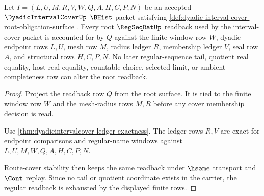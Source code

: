 \begin{theorem}
\label{thm:dyadic-interval-cover-root-regular-readback}
Let $I=(L,U,M,R,V,W,Q,A,H,C,P,N)$ be an accepted $\DyadicIntervalCoverUp$ $\BHist$ packet satisfying \autoref{def:dyadic-interval-cover-root-obligation-surface}. Every root $\RegSeqRatUp$ readback used by the interval-cover packet is accounted for by $Q$ against the finite window row $W$, dyadic endpoint rows $L,U$, mesh row $M$, radius ledger $R$, membership ledger $V$, seal row $A$, and structural rows $H,C,P,N$. No later regular-sequence tail, quotient real equality, host real equality, countable choice, selected limit, or ambient completeness row can alter the root readback.
\end{theorem}
\begin{proof}
Project the readback row $Q$ from the root surface. It is tied to the finite window row $W$ and the mesh-radius rows $M,R$ before any cover membership decision is read.

Use \autoref{thm:dyadicintervalcover-ledger-exactness}. The ledger rows $R,V$ are exact for endpoint comparisons and regular-name windows against $L,U,M,W,Q,A,H,C,P,N$.

Route-cover stability then keeps the same readback under $\hsame$ transport and $\Cont$ replay. Since no tail or quotient coordinate exists in the carrier, the regular readback is exhausted by the displayed finite rows.
\end{proof}

